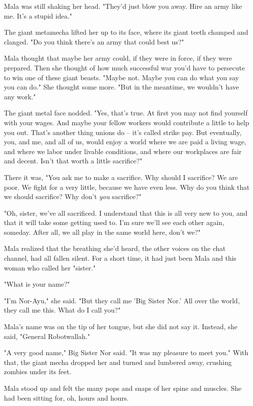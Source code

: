 Mala was still shaking her head. "They'd just blow you away. Hire
an army like me. It's a stupid idea."

The giant metamecha lifted her up to its face, where its giant
teeth champed and clanged. "Do you think there's an army that could
best us?"

Mala thought that maybe her army could, if they were in force, if
they were prepared. Then she thought of how much successful war
you'd have to persecute to win one of these giant beasts. "Maybe
not. Maybe you can do what you say you can do." She thought some
more. "But in the meantime, we wouldn't have any work."

The giant metal face nodded. "Yes, that's true. At first you may
not find yourself with your wages. And maybe your fellow workers
would contribute a little to help you out. That's another thing
unions do -- it's called strike pay. But eventually, you, and me,
and all of us, would enjoy a world where we are paid a living wage,
and where we labor under livable conditions, and where our
workplaces are fair and decent. Isn't that worth a little
sacrifice?"

There it was, "You ask me to make a sacrifice. Why should I
sacrifice? We are poor. We fight for a very little, because we have
even less. Why do you think that we should sacrifice? Why don't
\emph{you} sacrifice?"

"Oh, sister, we've all sacrificed. I understand that this is all
very new to you, and that it will take some getting used to. I'm
sure we'll see each other again, someday. After all, we all play in
the same world here, don't we?"

Mala realized that the breathing she'd heard, the other voices on
the chat channel, had all fallen silent. For a short time, it had
just been Mala and this woman who called her "sister."

"What is your name?"

"I'm Nor-Ayu," she said. "But they call me 'Big Sister Nor.' All
over the world, they call me this. What do I call you?"

Mala's name was on the tip of her tongue, but she did not say it.
Instead, she said, "General Robotwallah."

"A very good name," Big Sister Nor said. "It was my pleasure to
meet you." With that, the giant mecha dropped her and turned and
lumbered away, crushing zombies under its feet.

Mala stood up and felt the many pops and snaps of her spine and
muscles. She had been sitting for, oh, hours and hours.

